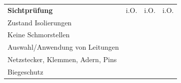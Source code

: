 \documentclass[11pt,a4paper,final,oneside,notitlepage]{report}
\begin{document}
	\begin{tabularx}{\textwidth}{|p{}| p{}|p{}|p{}|}
		\hline
		\rule{0pt}{15pt}\textbf{Sichtprüfung} & \raggedleft\arraybackslash \scriptsize{i.O.} & \cellcolor{gray!10}\raggedleft\arraybackslash \scriptsize{i.O.} & \raggedleft\arraybackslash \scriptsize{i.O.} \\[.25ex]
		{\scriptsize Zustand Isolierungen %
		} & \raggedleft\arraybackslash\makebox[0pt][l]{$\square$}\raisebox{.15ex}{\hspace{0.1em}}\,\,\,\,\,\,\, &
		\cellcolor{gray!10}\raggedleft\arraybackslash\makebox[0pt][l]{$\square$}\raisebox{.15ex}{\hspace{0.1em}}\,\,\,\,\,\,\, &
		\raggedleft\arraybackslash\makebox[0pt][l]{$\square$}\raisebox{.15ex}{\hspace{0.1em}}\,\,\,\,\,\,\,\\
		{\scriptsize Keine Schmorstellen} & \raggedleft\arraybackslash\makebox[0pt][l]{$\square$}\raisebox{.15ex}{\hspace{0.1em}}\,\,\,\,\,\,\, &
		\cellcolor{gray!10}\raggedleft\arraybackslash\makebox[0pt][l]{$\square$}\raisebox{.15ex}{\hspace{0.1em}}\,\,\,\,\,\,\, &
		\raggedleft\arraybackslash\makebox[0pt][l]{$\square$}\raisebox{.15ex}{\hspace{0.1em}}\,\,\,\,\,\,\, \\
		{\scriptsize Auswahl/Anwendung von Leitungen} &
		\raggedleft\arraybackslash\makebox[0pt][l]{$\square$}\raisebox{.15ex}{\hspace{0.1em}}\,\,\,\,\,\,\, &
		\cellcolor{gray!10}\raggedleft\arraybackslash\makebox[0pt][l]{$\square$}\raisebox{.15ex}{\hspace{0.1em}}\,\,\,\,\,\,\, &
		\raggedleft\arraybackslash\makebox[0pt][l]{$\square$}\raisebox{.15ex}{\hspace{0.1em}}\,\,\,\,\,\,\, \\
		{\scriptsize Netzstecker, Klemmen, Adern, Pins} &
		\raggedleft\arraybackslash\makebox[0pt][l]{$\square$}\raisebox{.15ex}{\hspace{0.1em}}\,\,\,\,\,\,\, &
		\cellcolor{gray!10}\raggedleft\arraybackslash\makebox[0pt][l]{$\square$}\raisebox{.15ex}{\hspace{0.1em}}\,\,\,\,\,\,\, &
		\raggedleft\arraybackslash\makebox[0pt][l]{$\square$}\raisebox{.15ex}{\hspace{0.1em}}\,\,\,\,\,\,\, \\
		{\scriptsize Biegeschutz } &

\end{tabularx}
\end{document}
